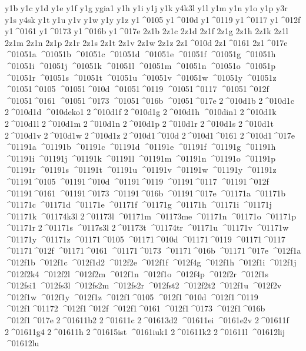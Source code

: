 {y1b
y1c
y1d
y1e
y1f
y1g
ygia1
y1h
y1i
y1j
y1k
y4k3l
y1l
y1m
y1n
y1o
y1p
y3r
y1s
y4sk
y1t
y1u
y1v
y1w
y1y
y1z
y1^^^^0105
y1^^^^010d
y1^^^^0119
y1^^^^0117
y1^^^^012f
y1^^^^0161
y1^^^^0173
y1^^^^016b
y1^^^^017e
2z1b
2z1c
2z1d
2z1f
2z1g
2z1h
2z1k
2z1l
2z1m
2z1n
2z1p
2z1r
2z1s
2z1t
2z1v
2z1w
2z1z
2z1^^^^010d
2z1^^^^0161
2z1^^^^017e
^^^^01051a
^^^^01051b
^^^^01051c
^^^^01051d
^^^^01051e
^^^^01051f
^^^^01051g
^^^^01051h
^^^^01051i
^^^^01051j
^^^^01051k
^^^^01051l
^^^^01051m
^^^^01051n
^^^^01051o
^^^^01051p
^^^^01051r
^^^^01051s
^^^^01051t
^^^^01051u
^^^^01051v
^^^^01051w
^^^^01051y
^^^^01051z
^^^^01051^^^^0105
^^^^01051^^^^010d
^^^^01051^^^^0119
^^^^01051^^^^0117
^^^^01051^^^^012f
^^^^01051^^^^0161
^^^^01051^^^^0173
^^^^01051^^^^016b
^^^^01051^^^^017e
2^^^^010d1b
2^^^^010d1c
2^^^^010d1d
^^^^010deko1
2^^^^010d1f
2^^^^010d1g
2^^^^010d1h
^^^^010din1
2^^^^010d1k
2^^^^010d1l
2^^^^010d1m
2^^^^010d1n
2^^^^010d1p
2^^^^010d1r
2^^^^010d1s
2^^^^010d1t
2^^^^010d1v
2^^^^010d1w
2^^^^010d1z
2^^^^010d1^^^^010d
2^^^^010d1^^^^0161
2^^^^010d1^^^^017e
^^^^01191a
^^^^01191b
^^^^01191c
^^^^01191d
^^^^01191e
^^^^01191f
^^^^01191g
^^^^01191h
^^^^01191i
^^^^01191j
^^^^01191k
^^^^01191l
^^^^01191m
^^^^01191n
^^^^01191o
^^^^01191p
^^^^01191r
^^^^01191s
^^^^01191t
^^^^01191u
^^^^01191v
^^^^01191w
^^^^01191y
^^^^01191z
^^^^01191^^^^0105
^^^^01191^^^^010d
^^^^01191^^^^0119
^^^^01191^^^^0117
^^^^01191^^^^012f
^^^^01191^^^^0161
^^^^01191^^^^0173
^^^^01191^^^^016b
^^^^01191^^^^017e
^^^^01171a
^^^^01171b
^^^^01171c
^^^^01171d
^^^^01171e
^^^^01171f
^^^^01171g
^^^^01171h
^^^^01171i
^^^^01171j
^^^^01171k
^^^^01174k3l
2^^^^01173l
^^^^01171m
^^^^01173me
^^^^01171n
^^^^01171o
^^^^01171p
^^^^01171r
2^^^^01171s
^^^^0117s3l
2^^^^01173t
^^^^01174tr
^^^^01171u
^^^^01171v
^^^^01171w
^^^^01171y
^^^^01171z
^^^^01171^^^^0105
^^^^01171^^^^010d
^^^^01171^^^^0119
^^^^01171^^^^0117
^^^^01171^^^^012f
^^^^01171^^^^0161
^^^^01171^^^^0173
^^^^01171^^^^016b
^^^^01171^^^^017e
^^^^012f1a
^^^^012f1b
^^^^012f1c
^^^^012f1d2
^^^^012f2e
^^^^012f1f
^^^^012f4g
^^^^012f1h
^^^^012f1i
^^^^012f1j
^^^^012f2k4
^^^^012f2l
^^^^012f2m
^^^^012f1n
^^^^012f1o
^^^^012f4p
^^^^012f2r
^^^^012f1s
^^^^012fsi1
^^^^012fs3l
^^^^012fs2m
^^^^012fs2r
^^^^012fst2
^^^^012f2t2
^^^^012f1u
^^^^012f2v
^^^^012f1w
^^^^012f1y
^^^^012f1z
^^^^012f1^^^^0105
^^^^012f1^^^^010d
^^^^012f1^^^^0119
^^^^012f1^^^^01172
^^^^012f1^^^^012f
^^^^012f1^^^^0161
^^^^012f1^^^^0173
^^^^012f1^^^^016b
^^^^012f1^^^^017e
2^^^^01611b2
2^^^^01611c
2^^^^01613d2
^^^^01611ei
^^^^0161e2v
2^^^^01611f
2^^^^01611g4
2^^^^01611h
2^^^^01615ist
^^^^0161iuk1
2^^^^01611k2
2^^^^01611l
^^^^01612lij
^^^^01612lu
}
